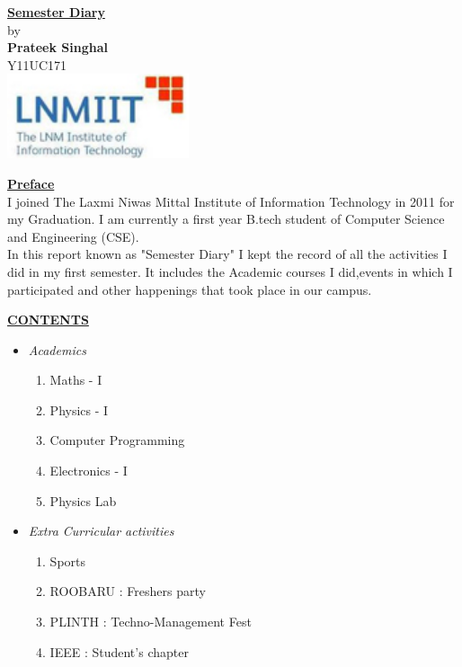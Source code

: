 \documentclass{report}
\begin{document}
\begin{center}

{\Huge \bf \underline{Semester Diary}}\vspace{1.2in}\\

{\Large by}\\
\vspace{1.2in}
{\Large \bf Prateek Singhal}\vspace{.1in} \\
{\large Y11UC171} \\
\vspace{1.5in}
\includegraphics [width=0.40\textwidth]{lnmiit.jpg}
\end{center}
\pagebreak
{\Huge \bf \underline{Preface}}\vspace{1.5in} \\
\large
\hspace*{1in} I joined The Laxmi Niwas Mittal Institute of Information Technology in 2011 for my Graduation. I am currently a first year B.tech student of Computer Science and Engineering (CSE).\vspace{.5in}\\
\hspace*{1in} In this report known as "Semester Diary" I kept the record of all the activities I did in my first semester. It includes the Academic courses I did,events in which I participated and other happenings that took place in our campus.
\pagebreak
\begin{center} {\Huge \bf \underline{CONTENTS}} \end{center}\vspace{.5in}
\Large
\begin{itemize}
\item \emph{Academics}
\begin{enumerate}
\item Maths - I
\item Physics - I
\item Computer Programming
\item Electronics - I
\item Physics Lab
\end{enumerate}
\item \emph{Extra Curricular activities}
\begin{enumerate}
\item Sports
\item ROOBARU : Freshers party
\item PLINTH : Techno-Management Fest
\item IEEE : Student's chapter
\end{enumerate}
\end{itemize}
\end{document}
